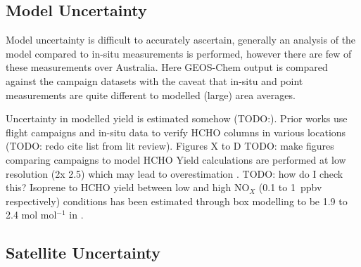   \subsection{Model Uncertainty}
    \label{Model:Uncertainty:Model}
    
    
    Model uncertainty is difficult to accurately ascertain, generally an analysis of the model compared to in-situ measurements is performed, however there are few of these measurements over Australia.
    Here GEOS-Chem output is compared against the campaign datasets with the caveat that in-situ and point measurements are quite different to modelled (large) area averages.
    
    
    Uncertainty in modelled yield is estimated somehow (TODO:).
    Prior works use flight campaigns and in-situ data to verify HCHO columns in various locations (TODO: redo cite list from lit review).
    Figures X to D TODO: make figures comparing campaigns to model HCHO
    Yield calculations are performed at low resolution (2\degr x 2.5\degr) which may lead to overestimation \parencite{Yu2016}.
    TODO: how do I check this?
    Isoprene to HCHO yield between low and high NO$_X$ (0.1 to 1~ppbv respectively) conditions has been estimated through box modelling to be 1.9 to 2.4 mol mol$^{-1}$ in \textcite{Bauwens2016}.
    
  \subsection{Satellite Uncertainty}
    \label{BioIsop:Uncertianty:Satellite}
    
